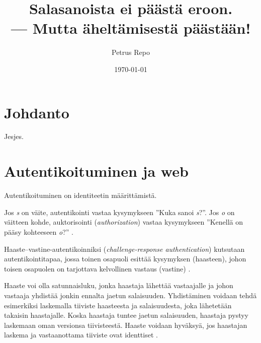 \documentclass{tktltiki}
\begin{document}
\title{Salasanoista ei päästä eroon.\\ --- Mutta äheltämisestä päästään!}
\author{Petrus Repo}
\date{\today}
\maketitle


\onehalfspacing

\subject{Tietojenkäsittelytiede}

\keywords{}

\begin{abstract}

\end{abstract}

\setcounter{tocdepth}{3}
\mytableofcontents


\section{Johdanto}

Jesjes.

\section{Autentikoituminen ja web}

Autentikoituminen on identiteetin määrittämistä. 

Jos \emph{s} on väite, autentikointi vastaa kysymykseen ''Kuka sanoi \emph{s}?''.
Jos \emph{o} on väitteen kohde, auktorisointi (\emph{authorization}) vastaa kysymykseen ''Kenellä on pääsy kohteeseen \emph{o}?'' \cite{lampson_distributed_1992}.


Haaste--vastine-autentikoinniksi (\emph{challenge-response authentication}) kutsutaan autentikointitapaa, jossa toinen osapuoli esittää kysymyksen (haasteen), johon toisen osapuolen on tarjottava kelvollinen vastaus (vastine) \cite{NIST_SP800-63}. 

Haaste voi olla satunnaisluku, jonka haastaja lähettää vastaajalle ja johon vastaaja yhdistää jonkin ennalta jaetun salaisuuden. Yhdistäminen voidaan tehdä esimerkiksi laskemalla tiiviste haasteesta ja salaisuudesta, joka lähetetään takaisin haastajalle. Koska haastaja tuntee jaetun salaisuuden, haastaja pystyy laskemaan oman versionsa tiivisteestä. Haaste voidaan hyväksyä, jos haastajan laskema ja vastaanottama tiiviste ovat identtiset \cite{NIST_SP800-63}.
\end{document}
